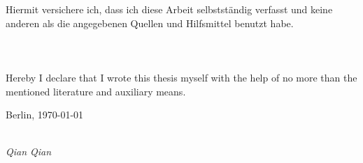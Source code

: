 \newpage

\thispagestyle{empty}

\begin{large}

\vspace*{6cm}

\noindent
Hiermit versichere ich, dass ich diese Arbeit selbstst\"andig verfasst und keine anderen als die
angegebenen Quellen und Hilfsmittel benutzt habe.
\\\\\\\\
Hereby I declare that I wrote this thesis myself with the help of no more than the mentioned literature and auxiliary means.
\vspace{2cm}

\noindent
Berlin, \today

\vspace{1cm}

\hspace*{5cm}%
\dotfill\\
\hspace*{9.1cm}%
\textit{Qian Qian}

\end{large}
